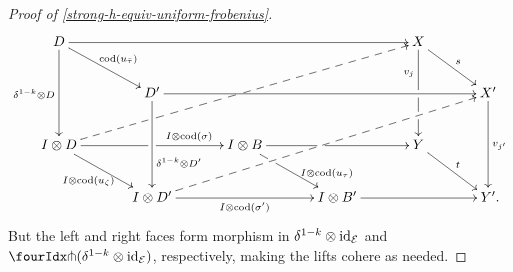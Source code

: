 \documentclass[reqno,10pt,a4paper,oneside,draft]{amsart}
\begin{document}
\begin{proof}[Proof of \cref{strong-h-equiv-uniform-frobenius}]
\[
\xymatrix@C+1em{
  D
  \ar[rrrr]
  \ar[dd]_{\kcylinv \otimes D}
  \ar[dr]^{\cod(u_{\bar{\tau}})}
&&&&
  X
  \ar[dd]_(0.3){v_j}|!{[dlll];[dr]}{\hole}|!{[dddlll];[dr]}{\hole}
  \ar[dr]^{s}
\\&
  D'
  \ar[rrrr]
  \ar[dd]^(0.66){\kcylinv \otimes D'}
&&&&
  X'
  \ar[dd]^{v_{j'}}
\\
  \interval \otimes D
  \ar[rr]^(0.7){I \otimes \cod(\sigma)}|!{[ur];[dr]}{\hole}
  \ar@{-->}[uurrrr]|!{[ur];[dr]}{\hole}|!{[ur];[urrrrr]}{\hole} %
  \ar[dr]_{I \otimes \cod(u_{\zeta})}
&&
  \interval \otimes B
  \ar[rr]|!{[dl];[urrr]}{\hole}
  \ar[dr]^(0.7){\interval \otimes \cod(u_\tau)}|!{[dl];[urrr]}{\hole}
&&
  Y
  \ar[dr]^{t}
\\&
  \interval \otimes D'
  \ar[rr]_{I \otimes \cod(\sigma')}
  \ar@{-->}[uurrrr]
&&
  \interval \otimes B'
  \ar[rr]
&&
  Y'
\rlap{.}}
\]
But the left and right faces form morphism in $\delta^{1-k} \otimes \operatorname{id}_{\mathcal{E}}$ and $\liftr{(\kcylinv \otimes \id_\catE)}$, respectively, making the lifts cohere as needed.
\end{proof}



\end{document}
